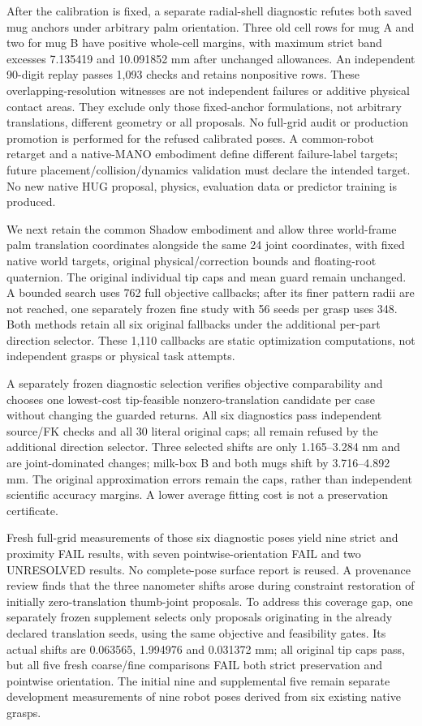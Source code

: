 \documentclass[10pt,letterpaper]{article}
\begin{document}
After the calibration is fixed, a separate radial-shell diagnostic refutes
both saved mug anchors under arbitrary palm orientation. Three old cell rows
for mug A and two for mug B have positive whole-cell margins, with maximum
strict band excesses 7.135419 and 10.091852 mm after unchanged allowances.
An independent 90-digit replay passes 1,093 checks and retains nonpositive
rows. These overlapping-resolution witnesses are not independent failures
or additive physical contact areas. They exclude only those fixed-anchor
formulations, not arbitrary translations, different geometry or all proposals.
No full-grid audit or production promotion is performed for the refused
calibrated poses. A common-robot retarget and a native-MANO embodiment define
different failure-label targets; future placement/collision/dynamics validation
must declare the intended target. No new native HUG proposal, physics,
evaluation data or predictor training is produced.

We next retain the common Shadow embodiment and allow three world-frame palm
translation coordinates alongside the same 24 joint coordinates, with fixed
native world targets, original physical/correction bounds and floating-root
quaternion. The original individual tip caps and mean guard remain unchanged.
A bounded search uses 762 full objective callbacks; after its finer pattern
radii are not reached, one separately frozen fine study with 56 seeds per grasp uses 348.
Both methods retain all six original fallbacks under the additional per-part
direction selector. These 1,110 callbacks are static optimization computations,
not independent grasps or physical task attempts.

A separately frozen diagnostic selection verifies objective comparability and
chooses one lowest-cost tip-feasible nonzero-translation candidate per case
without changing the guarded returns. All six diagnostics pass independent
source/FK checks and all 30 literal original caps; all remain refused by the
additional direction selector. Three selected shifts are only 1.165--3.284 nm and are
joint-dominated changes; milk-box B and both mugs shift by 3.716--4.892 mm.
The original approximation errors remain the caps, rather than independent
scientific accuracy margins. A lower average fitting cost is not a preservation
certificate.

Fresh full-grid measurements of those six diagnostic poses yield nine strict
and proximity FAIL results, with seven pointwise-orientation FAIL and two
UNRESOLVED results. No complete-pose surface report is reused. A provenance
review finds that the three nanometer shifts arose during constraint
restoration of initially zero-translation thumb-joint proposals. To address
this coverage gap, one separately frozen supplement selects only proposals
originating in the already declared translation seeds, using the same
objective and feasibility gates. Its actual shifts are 0.063565, 1.994976 and
0.031372 mm; all original tip caps pass, but all five fresh coarse/fine
comparisons FAIL both strict preservation and pointwise orientation. The
initial nine and supplemental five remain separate development measurements
of nine robot poses derived from six existing native grasps.
\end{document}
